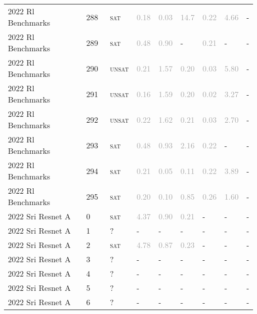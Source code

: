 \begin{center}
{\begin{longtable}{@{}lllllllll@{}}
2022 Rl Benchmarks & 288 & ~\textsc{sat} & \textcolor{darkgray}{0.18} & \textcolor{darkgray}{0.03} & \textcolor{darkgray}{14.7} & \textcolor{darkgray}{0.22} & \textcolor{darkgray}{4.66} & - \\
2022 Rl Benchmarks & 289 & ~\textsc{sat} & \textcolor{darkgray}{0.48} & \textcolor{darkgray}{0.90} & - & \textcolor{darkgray}{0.21} & - & - \\
2022 Rl Benchmarks & 290 & ~\textsc{unsat} & \textcolor{darkgray}{0.21} & \textcolor{darkgray}{1.57} & \textcolor{darkgray}{0.20} & \textcolor{darkgray}{0.03} & \textcolor{darkgray}{5.80} & - \\
2022 Rl Benchmarks & 291 & ~\textsc{unsat} & \textcolor{darkgray}{0.16} & \textcolor{darkgray}{1.59} & \textcolor{darkgray}{0.20} & \textcolor{darkgray}{0.02} & \textcolor{darkgray}{3.27} & - \\
2022 Rl Benchmarks & 292 & ~\textsc{unsat} & \textcolor{darkgray}{0.22} & \textcolor{darkgray}{1.62} & \textcolor{darkgray}{0.21} & \textcolor{darkgray}{0.03} & \textcolor{darkgray}{2.70} & - \\
2022 Rl Benchmarks & 293 & ~\textsc{sat} & \textcolor{darkgray}{0.48} & \textcolor{darkgray}{0.93} & \textcolor{darkgray}{2.16} & \textcolor{darkgray}{0.22} & - & - \\
2022 Rl Benchmarks & 294 & ~\textsc{sat} & \textcolor{darkgray}{0.21} & \textcolor{darkgray}{0.05} & \textcolor{darkgray}{0.11} & \textcolor{darkgray}{0.22} & \textcolor{darkgray}{3.89} & - \\
2022 Rl Benchmarks & 295 & ~\textsc{sat} & \textcolor{darkgray}{0.20} & \textcolor{darkgray}{0.10} & \textcolor{darkgray}{0.85} & \textcolor{darkgray}{0.26} & \textcolor{darkgray}{1.60} & - \\
\midrule
2022 Sri Resnet A & 0 & ~\textsc{sat} & \textcolor{darkgray}{4.37} & \textcolor{darkgray}{0.90} & \textcolor{darkgray}{0.21} & - & - & - \\
2022 Sri Resnet A & 1 & ~? & - & - & - & - & - & - \\
2022 Sri Resnet A & 2 & ~\textsc{sat} & \textcolor{darkgray}{4.78} & \textcolor{darkgray}{0.87} & \textcolor{darkgray}{0.23} & - & - & - \\
2022 Sri Resnet A & 3 & ~? & - & - & - & - & - & - \\
2022 Sri Resnet A & 4 & ~? & - & - & - & - & - & - \\
2022 Sri Resnet A & 5 & ~? & - & - & - & - & - & - \\
2022 Sri Resnet A & 6 & ~? & - & - & - & - & - & - \\

\end{longtable}}
\end{center}
